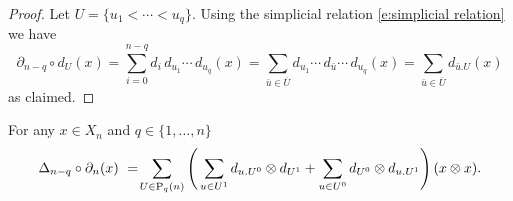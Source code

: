 \begin{proof}
	Let $U = \{u_1 < \cdots < u_q\}$. Using the simplicial relation \eqref{e:simplicial relation} we have
	\begin{equation*}
	\partial_{n-q} \circ d_U(x) =
	\sum_{i=0}^{n-q} d_i\, d_{u_1} \cdots\, d_{u_q}(x) =
	\sum_{\bar{u} \in \overline{U}} d_{u_1} \cdots\, d_{\bar{u}} \cdots\, d_{u_q}(x) =
	\sum_{\bar{u} \in \overline{U}} d_{\bar{u}.U}(x)
	\end{equation*}
	as claimed.
\end{proof}

\begin{lemma} \label{l:pigeon hole}
	For any $x \in X_n$ and $q \in \{1, \dots, n\}$
	\begin{equation} \label{e:pigeon hole 1}
	\Delta_{n-q} \circ \partial_n (x)\ =\!
	\sum_{U \in \P_q(n)} \left( \,
	\sum_{u \in U^1} d_{u.U^0} \otimes d_{U^1} +
	\sum_{u \in U^0} d_{U^0} \otimes d_{u.U^1} \right)(x \otimes x).
	\end{equation}
\end{lemma}

